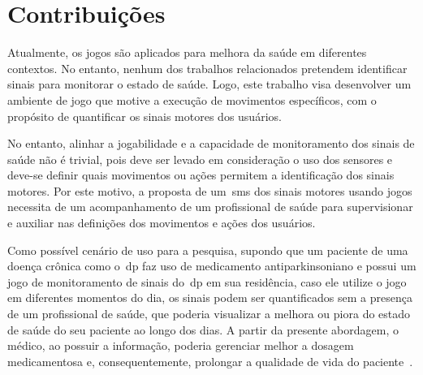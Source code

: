 \section{Contribuições}
Atualmente, os jogos são aplicados para melhora da saúde em diferentes contextos. No entanto, nenhum dos trabalhos relacionados pretendem identificar sinais para monitorar o estado de saúde. Logo, este trabalho visa desenvolver um ambiente de jogo que motive a execução de movimentos específicos, com o propósito de quantificar os sinais motores dos usuários.

No entanto, alinhar a jogabilidade e a capacidade de monitoramento dos sinais de saúde não é trivial, pois deve ser levado em consideração o uso dos sensores e deve-se definir quais movimentos ou ações permitem a identificação dos sinais motores. Por este motivo, a proposta de um~\ac{sms} dos sinais motores usando jogos necessita de um acompanhamento de um profissional de saúde para supervisionar e auxiliar nas definições dos movimentos e ações dos usuários. 


Como possível cenário de uso para a pesquisa, supondo que um paciente de uma doença crônica como o~\ac{dp} faz uso de medicamento antiparkinsoniano e possui um jogo de monitoramento de sinais do~\ac{dp} em sua residência, caso ele utilize o jogo em diferentes momentos do dia, os sinais podem ser quantificados sem a presença de um profissional de saúde, que poderia visualizar a melhora ou piora do estado de saúde do seu paciente ao longo dos dias. A partir da presente abordagem, o médico, ao possuir a informação, poderia gerenciar melhor a dosagem medicamentosa e, consequentemente, prolongar a qualidade de vida do paciente~\cite{abn2010}.

